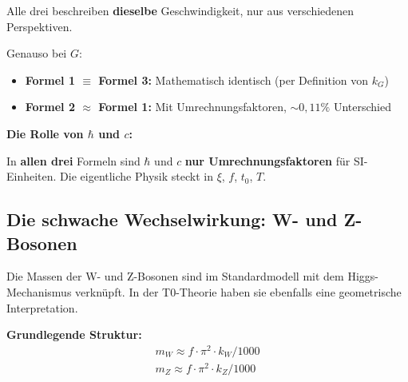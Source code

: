 	Alle drei beschreiben \textbf{dieselbe} Geschwindigkeit, nur aus verschiedenen Perspektiven.
	
	Genauso bei \(G\):
	\begin{itemize}
		\item \textbf{Formel 1 \(\equiv\) Formel 3:} Mathematisch identisch (per Definition von \(k_G\))
		\item \textbf{Formel 2 \(\approx\) Formel 1:} Mit Umrechnungsfaktoren, \(\sim0{,}11\%\) Unterschied
	\end{itemize}
	
	\textbf{Die Rolle von \(\hbar\) und \(c\):}
	
	In \textbf{allen drei} Formeln sind \(\hbar\) und \(c\) \textbf{nur Umrechnungsfaktoren} für SI-Einheiten. Die eigentliche Physik steckt in \(\xi\), \(f\), \(t_0\), \(T\).
	
	\begin{table}[h!]
		\centering
		\caption{Die drei Perspektiven auf \(G\) -- eine Konstante, drei Sichtweisen.}
	\end{table}
	
	\subsection{Die schwache Wechselwirkung: W- und Z-Bosonen}
	
	Die Massen der W- und Z-Bosonen sind im Standardmodell mit dem Higgs-Mechanismus verknüpft. In der T0-Theorie haben sie ebenfalls eine geometrische Interpretation.
	
	\textbf{Grundlegende Struktur:}
	\begin{align}
		\boxed{m_W \approx f \cdot \pi^2 \cdot k_W / 1000} \\
		\boxed{m_Z \approx f \cdot \pi^2 \cdot k_Z / 1000}
	\end{align}
	
